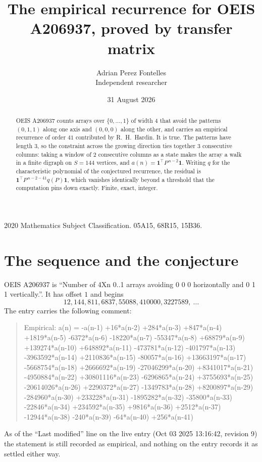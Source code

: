 \documentclass[11pt,a4paper]{article}
\title{The empirical recurrence for OEIS A206937, proved by transfer matrix}
\author{Adrian Perez Fontelles\\ \small Independent researcher}
\date{31 August 2026}
\theoremstyle{plain}
\theoremstyle{definition}
\begin{document}
\maketitle

\begin{abstract}
OEIS A206937 counts arrays over $\{0,\dots,1\}$ of width $4$ that avoid the patterns
$(0,1,1)$ along one axis and $(0,0,0)$ along the other, and carries an empirical recurrence of
order $41$ contributed by R.~H.~Hardin. It is true. The patterns have length $3$, so
the constraint across the growing direction ties together $3$ consecutive columns: taking a
window of $2$ consecutive columns as a state makes the array a walk in a finite digraph
on $S=144$ vertices, and $a(n)=\mathbf{1}^{\!\top}P^{\,n-2}\mathbf{1}$. Writing $q$
for the characteristic polynomial of the conjectured recurrence, the residual is
$\mathbf{1}^{\!\top}P^{\,n-2-41}q(P)\mathbf{1}$, which vanishes identically
beyond a threshold that the computation pins down exactly. Finite, exact, integer.
\end{abstract}

\noindent\small 2020 Mathematics Subject Classification. 05A15, 68R15, 15B36.\normalsize

\section{The sequence and the conjecture}

OEIS A206937 is ``Number of 4Xn 0..1 arrays avoiding 0 0 0 horizontally and 0 1 1 vertically.''. It has offset
$1$ and begins
\[
12, 144, 811, 6837, 55088, 410000, 3227589,\ \dots
\]
The entry carries the following comment:
\begin{quote}\small
Empirical: a(n) = -a(n-1) +16*a(n-2) +284*a(n-3) +847*a(n-4) +1819*a(n-5) -6372*a(n-6) -18220*a(n-7) -55347*a(n-8) +68879*a(n-9) +139274*a(n-10) +648892*a(n-11) -473781*a(n-12) -401797*a(n-13) -3963592*a(n-14) +2110836*a(n-15) -80057*a(n-16) +13663197*a(n-17) -5668754*a(n-18) +2666692*a(n-19) -27046299*a(n-20) +8341017*a(n-21) -4950884*a(n-22) +30801116*a(n-23) -6296865*a(n-24) +3755693*a(n-25) -20614026*a(n-26) +2290372*a(n-27) -1349783*a(n-28) +8200897*a(n-29) -284960*a(n-30) +233228*a(n-31) -1895282*a(n-32) -35800*a(n-33) -22846*a(n-34) +234592*a(n-35) +9816*a(n-36) +2512*a(n-37) -12944*a(n-38) -240*a(n-39) -64*a(n-40) +256*a(n-41)
\end{quote}
As of the ``Last modified'' line on the live entry (Oct 03 2025 13:16:42, revision
9) the statement is still recorded as empirical, and nothing on the entry
records it as settled either way.
\end{document}
